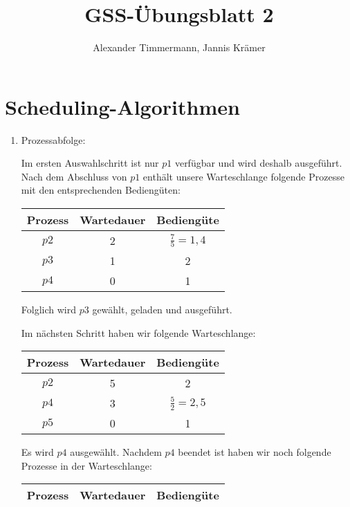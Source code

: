 \documentclass[a4paper,11pt,ngerman]{scrartcl}
\author{Alexander Timmermann, Jannis Krämer}
\title{GSS-Übungsblatt 2}
\date{}
\begin{document}
\maketitle
\thispagestyle{empty}

\doublespace

\section{Scheduling-Algorithmen}

\begin{enumerate}[\bf a)]
    \item Prozessabfolge:\\
        \begin{figure}[h]
            \scalebox{0.56}{}
        \end{figure}

        Im ersten Auswahlschritt ist nur $p1$ verfügbar und wird deshalb
        ausgeführt. Nach dem Abschluss von $p1$ enthält unsere Warteschlange
        folgende Prozesse mit den entsprechenden Bediengüten:

        \begin{tabular}{c|c|c}
            \textbf{Prozess} & \textbf{Wartedauer} & \textbf{Bediengüte}\\
            \hline

            $p2$ & 2 & $\frac{7}{5} = 1,4$\\
            $p3$ & 1 & 2\\
            $p4$ & 0 & 1
        \end{tabular}

        Folglich wird $p3$ gewählt, geladen und ausgeführt.

        Im nächsten Schritt haben wir folgende Warteschlange:

        \begin{tabular}{c|c|c}
            \textbf{Prozess} & \textbf{Wartedauer} & \textbf{Bediengüte}\\
            \hline

            $p2$ & 5 & 2\\
            $p4$ & 3 & $\frac{5}{2} = 2,5$\\
            $p5$ & 0 & 1
        \end{tabular}

        Es wird $p4$ ausgewählt. Nachdem $p4$ beendet ist haben wir noch folgende
        Prozesse in der Warteschlange:

        \begin{tabular}{c|c|c}
            \textbf{Prozess} & \textbf{Wartedauer} & \textbf{Bediengüte}\\
            \hline


\end{tabular}
\end{enumerate}
\end{document}
